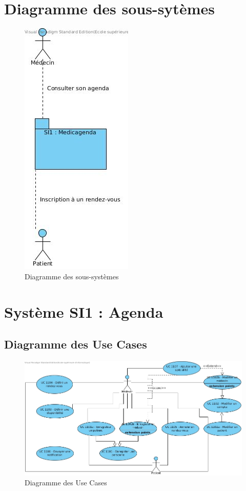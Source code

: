\documentclass[a4paper, 11pt]{report}
\begin{document}
\section{Diagramme des sous-sytèmes}
\begin{figure}[hb]
	\centering
	\includegraphics[scale=0.7]{sous-systeme.jpg}
	\caption{Diagramme des sous-systèmes}
	\label{fig:sous-systeme}
\end{figure}
\newpage
\section{Système SI1 : Agenda}
\subsection{Diagramme des Use Cases}
\begin{figure}[hb]
	\centering
	\includegraphics[scale=0.5]{SS1_UC.jpg}
	\caption{Diagramme des Use Cases}
	\label{fig:ss1_uc}
\end{figure}
\end{document}

